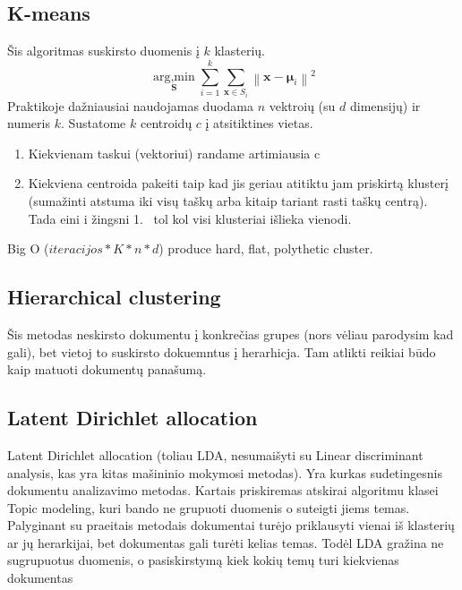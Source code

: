 \documentclass{VUMIFInfKursinis}
\begin{document}
\subsection{K-means}
Šis algoritmas suskirsto duomenis į $ k $ klasterių.
\[ \underset{\mathbf{S}} {\operatorname{\arg,\min}}  \sum_{i=1}^{k} \sum_{\mathbf x \in S_i} \left\| \mathbf x - \boldsymbol\mu_i \right\|^2 \]
Praktikoje dažniausiai naudojamas duodama $n$ vektroių (su $d$ dimensijų) ir numeris $k$.
Sustatome $k$ centroidų $c$ į atsitiktines vietas.
\begin{enumerate}
\item Kiekvienam taskui (vektoriui) randame artimiausia c
\item Kiekviena centroida pakeiti taip kad jis geriau atitiktu jam priskirtą klusterį (sumažinti atstuma iki visų taškų arba kitaip tariant rasti taškų centrą). Tada eini i žingsni  1.\ %
	tol kol visi klusteriai išlieka vienodi.
\end{enumerate}
Big O ($iteracijos*K*n*d$) produce hard, flat, polythetic cluster. 

\subsection{Hierarchical clustering}
Šis metodas neskirsto dokumentu į konkrečias grupes (nors vėliau parodysim kad gali), bet vietoj to suskirsto dokuemntus į herarhicja. Tam atlikti reikiai būdo kaip matuoti dokumentų panašumą. 

\subsection{Latent Dirichlet allocation}
Latent Dirichlet allocation (toliau LDA, nesumaišyti su Linear discriminant analysis, kas yra kitas mašininio mokymosi metodas). Yra kurkas sudetingesnis dokumentu analizavimo metodas. Kartais priskiremas atskirai algoritmu klasei Topic modeling, kuri bando ne grupuoti duomenis o suteigti jiems temas. Palyginant su praeitais metodais dokumentai turėjo priklausyti vienai iš klasterių ar jų herarkijai, bet dokumentas gali turėti kelias temas. 
Todėl LDA gražina ne sugrupuotus duomenis, o pasiskirstymą kiek kokių temų turi kiekvienas dokumentas  
\end{document}
